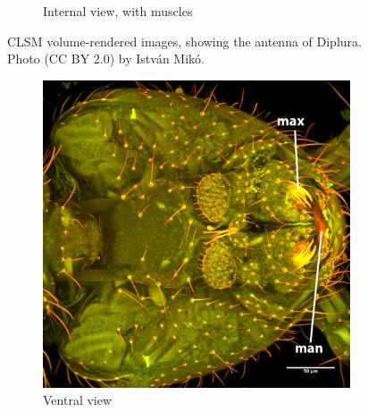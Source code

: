 \documentclass[letterpaper, 11pt]{article}
\begin{document}
\begin{figure}[ht!]
\begin{subfigure}[ht!]{0.45\textwidth}
        \caption{Internal view, with muscles}
        \label{fig:diplant2}
    \end{subfigure}
    \caption{CLSM volume-rendered images, showing the antenna of Diplura. Photo (CC BY 2.0) by Istv\'an Mik\'o.}\label{fig:dipluraant}
\end{figure}

\begin{figure}[ht!]
    \centering
    \begin{subfigure}[ht!]{0.45\textwidth}
        \includegraphics[width=\textwidth]{image33}
        \caption{Ventral view}
        \label{fig:dipheadvent}
    \end{subfigure}
    ~ %
    \begin{subfigure}[ht!]{0.45\textwidth}

\end{subfigure}
\end{figure}
\end{document}
